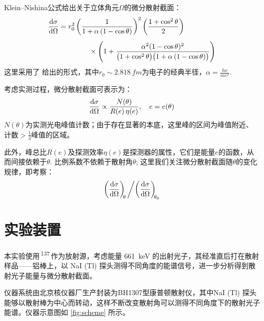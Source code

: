 \documentclass[aps,pre,12pt,preprint,%
	onecolumn,showpacs,showkeys,nofootinbib]{revtex4-1}
\newcommand{\CsAtom}{\,\textsuperscript{137}\tup{Cs}\,}
\begin{document}
	Klein--Nishina公式给出关于立体角元$\Omega$的微分散射截面：
	\begin{equation}
	\begin{aligned}
		\dv{\sigma}{\Omega}
		= r_0^2
		&\left(\frac{1}{1+\alpha\,(1-\cos \theta )}\right)^2
		\left(\frac{1+\cos ^2\theta}{2}\right)\\[1ex]
		&\qquad\times\left(1+\frac{\alpha ^2 (1-\cos\theta )^2}{\pqty\big{1+\cos^2\theta} \pqty\big{1+\alpha\,(1-\cos \theta )}}\right)
	\end{aligned}
	\end{equation}
	这里采用了 \cite{textbook} 给出的形式，其中$r_0 \sim \SI{2.818}{fm}$为电子的经典半径，$\alpha = \frac{h\nu}{mc^2}$. 
	
	考虑实测过程，微分散射截面可表示为：
	\begin{equation}
		\dv{\sigma}{\Omega}
		\propto \frac{N(\theta)}{R(e)\,\eta(e)},\quad
		e = e(\theta)
	\end{equation}
	$N(\theta)$为实测光电峰值计数；由于存在显著的本底，这里峰的区间为峰值附近、计数$>\frac{1}{3}$峰值的区域。
	
	此外，峰总比$R(e)$及探测效率$\eta(e)$是探测器的属性，它们是能量$e$的函数，从而间接依赖于$\theta$. 比例系数不依赖于散射角$\theta$; 这里我们关注微分散射截面随$\theta$的变化规律，即考察：
	\[ \pqty{\dv{\sigma}{\Omega}}_{\!\!\theta}\,
	\bigg/ \pqty{\dv{\sigma}{\Omega}}_{\!\!\theta_0} \]
\section{实验装置}
	本实验使用\CsAtom 作为放射源，考虑能量 \SI{661}{\keV} 的出射光子，其经准直后打在散射样品——铝棒上，以 NaI (Tl) 探头测得不同角度的能谱信号，进一步分析得到散射光子能量与微分散射截面。
	
	仪器系统由北京核仪器厂生产封装为BH1307型康普顿散射仪，其中NaI (Tl) 探头能够以散射棒为中心而转动，这样不断改变散射角可以测得不同角度下的散射光子能谱。仪器示意图如 \ref{fig:scheme} 所示。
	
\end{document}
